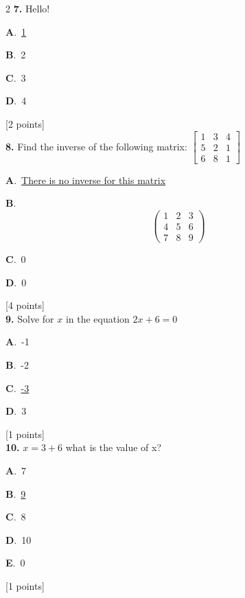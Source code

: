 \documentclass[12pt]{article}
\newcommand{\choice}[3]{%
  \noindent\textbf{#1}.~#2\hfill#3\par\vspace{0.25em}
}
\begin{document}
\begin{multicols}{2}
\noindent \textbf{\textenglish{7.}} {\textenglish{Hello!}}

\noindent\choice{A}{\underline{{\textenglish{1}}}}{}
\noindent\choice{B}{{\textenglish{2}}}{}
\noindent\choice{C}{{\textenglish{3}}}{}
\noindent\choice{D}{{\textenglish{4}}}{}
\hfill {\textenglish{[2 points]}}\\[0.5em]

\noindent \textbf{\textenglish{8.}} {\textenglish{Find the inverse of the following matrix: }}\(\begin{bmatrix} 1 & 3 & 4 \\ 5 & 2 & 1 \\ 6 & 8 & 1 \end{bmatrix}\)

\noindent\choice{A}{\underline{{\textenglish{There is no inverse for this matrix}}}}{}
\noindent\choice{B}{\[\begin{pmatrix} 1 & 2 & 3 \\ 4 & 5 & 6 \\ 7 & 8 & 9  \end{pmatrix}\]}{}
\noindent\choice{C}{{\textenglish{0}}}{}
\noindent\choice{D}{{\textenglish{0}}}{}
\hfill {\textenglish{[4 points]}}\\[0.5em]

\noindent \textbf{\textenglish{9.}} {\textenglish{Solve for }}\(x \){\textenglish{ in the equation }}\(2x+6 = 0 \)

\noindent\choice{A}{{\textenglish{-1}}}{}
\noindent\choice{B}{{\textenglish{-2}}}{}
\noindent\choice{C}{\underline{{\textenglish{-3}}}}{}
\noindent\choice{D}{{\textenglish{3}}}{}
\hfill {\textenglish{[1 points]}}\\[0.5em]

\noindent \textbf{\textenglish{10.}} \(x=3+6 \){\textenglish{ what is the value of x?}}

\noindent\choice{A}{{\textenglish{7}}}{}
\noindent\choice{B}{\underline{{\textenglish{9}}}}{}
\noindent\choice{C}{{\textenglish{8}}}{}
\noindent\choice{D}{{\textenglish{10}}}{}
\noindent\choice{E}{{\textenglish{0}}}{}
\hfill {\textenglish{[1 points]}}\\[0.5em]


\end{multicols}
\end{document}
